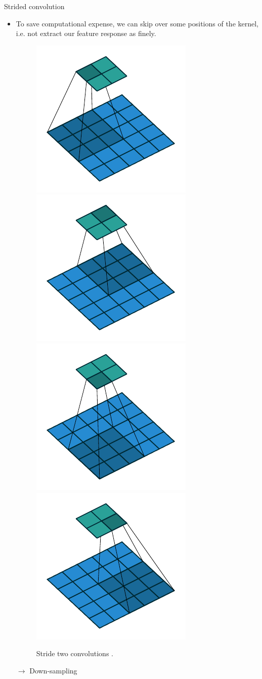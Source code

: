 \documentclass{beamer}
\begin{document}
	\begin{frame}{Strided convolution}
	\begin{itemize}
		\item To save computational expense, we can skip over some positions of the kernel, i.e. not extract our feature response as finely.
	\begin{figure}
            \centering
            \includegraphics[width=0.25\linewidth]{figures/no_padding_strides_00.pdf}
            \includegraphics[width=0.25\linewidth]{figures/no_padding_strides_01.pdf} \\
            \includegraphics[width=0.25\linewidth]{figures/no_padding_strides_02.pdf}
            \includegraphics[width=0.25\linewidth]{figures/no_padding_strides_03.pdf}
            \caption{Stride two convolutions \cite{dumoulin2016guide}.}
        \end{figure}
				\item[$\rightarrow$ Down-sampling]
		\end{itemize}
	\end{frame}
	
\end{document}
